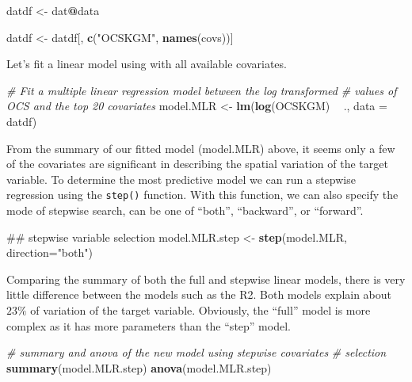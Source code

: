 \documentclass[10pt,b5paper,]{book}
\newenvironment{Shaded}{\begin{snugshade}}{\end{snugshade}}
\newcommand{\CommentTok}[1]{\textcolor[rgb]{0.56,0.35,0.01}{\textit{#1}}}
\newcommand{\DataTypeTok}[1]{\textcolor[rgb]{0.13,0.29,0.53}{#1}}
\newcommand{\KeywordTok}[1]{\textcolor[rgb]{0.13,0.29,0.53}{\textbf{#1}}}
\newcommand{\NormalTok}[1]{#1}
\newcommand{\OperatorTok}[1]{\textcolor[rgb]{0.81,0.36,0.00}{\textbf{#1}}}
\newcommand{\StringTok}[1]{\textcolor[rgb]{0.31,0.60,0.02}{#1}}
\theoremstyle{definition}
\theoremstyle{definition}
\theoremstyle{definition}
\theoremstyle{remark}
\begin{document}
\begin{Shaded}
\begin{Highlighting}[]
\NormalTok{datdf <-}\StringTok{ }\NormalTok{dat}\OperatorTok{@}\NormalTok{data}

\NormalTok{datdf <-}\StringTok{ }\NormalTok{datdf[, }\KeywordTok{c}\NormalTok{(}\StringTok{"OCSKGM"}\NormalTok{, }\KeywordTok{names}\NormalTok{(covs))]}
\end{Highlighting}
\end{Shaded}

Let's fit a linear model using with all available covariates.

\begin{Shaded}
\begin{Highlighting}[]
\CommentTok{# Fit a multiple linear regression model between the log transformed}
\CommentTok{# values of OCS and the top 20 covariates}
\NormalTok{model.MLR <-}\StringTok{ }\KeywordTok{lm}\NormalTok{(}\KeywordTok{log}\NormalTok{(OCSKGM) }\OperatorTok{~}\StringTok{ }\NormalTok{., }\DataTypeTok{data =}\NormalTok{ datdf)}
\end{Highlighting}
\end{Shaded}

From the summary of our fitted model (model.MLR) above, it seems only a
few of the covariates are significant in describing the spatial
variation of the target variable. To determine the most predictive model
we can run a stepwise regression using the \texttt{step()} function.
With this function, we can also specify the mode of stepwise search, can
be one of ``both'', ``backward'', or ``forward''.

\begin{Shaded}
\begin{Highlighting}[]
\NormalTok{## stepwise variable selection}
\NormalTok{model.MLR.step <-}\StringTok{ }\KeywordTok{step}\NormalTok{(model.MLR, }\DataTypeTok{direction=}\StringTok{"both"}\NormalTok{)}
\end{Highlighting}
\end{Shaded}

Comparing the summary of both the full and stepwise linear models, there
is very little difference between the models such as the R2. Both models
explain about \(23\%\) of variation of the target variable. Obviously,
the ``full'' model is more complex as it has more parameters than the
``step'' model.

\begin{Shaded}
\begin{Highlighting}[]
\CommentTok{# summary and anova of the new model using stepwise covariates}
\CommentTok{# selection}
\KeywordTok{summary}\NormalTok{(model.MLR.step)}
\KeywordTok{anova}\NormalTok{(model.MLR.step)}
\end{Highlighting}
\end{Shaded}
\end{document}
